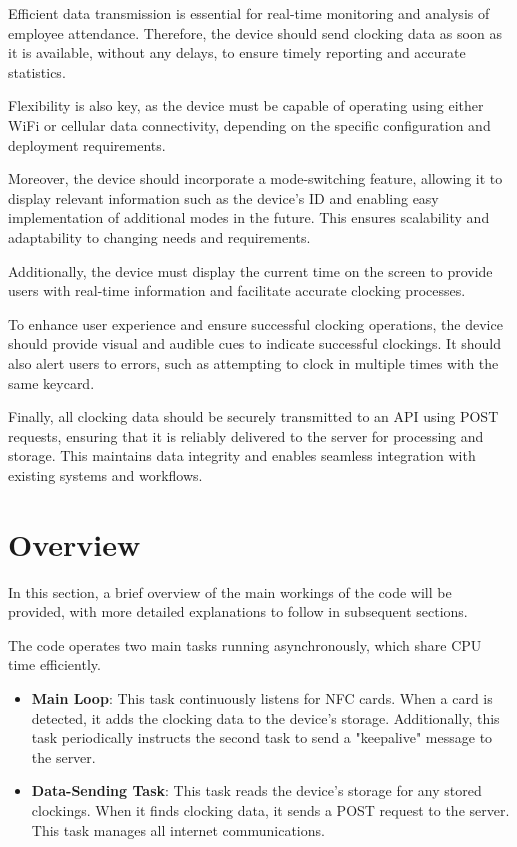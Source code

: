 Efficient data transmission is essential for real-time monitoring and analysis of employee 
attendance. Therefore, the device should send clocking data as soon as it is available, without any 
delays, to ensure timely reporting and accurate statistics.

Flexibility is also key, as the device must be capable of operating using either WiFi or cellular 
data connectivity, depending on the specific configuration and deployment requirements.

Moreover, the device should incorporate a mode-switching feature, allowing it to display relevant 
information such as the device's ID and enabling easy implementation of additional modes in the 
future. This ensures scalability and adaptability to changing needs and requirements.

Additionally, the device must display the current time on the screen to provide users with 
real-time information and facilitate accurate clocking processes.

To enhance user experience and ensure successful clocking operations, the device should provide 
visual and audible cues to indicate successful clockings. It should also alert users to errors, 
such as attempting to clock in multiple times with the same keycard.

Finally, all clocking data should be securely transmitted to an API using POST requests, ensuring 
that it is reliably delivered to the server for processing and storage. This maintains data 
integrity and enables seamless integration with existing systems and workflows.



%
%

\section{Overview}

In this section, a brief overview of the main workings of the code will be provided, with more 
detailed explanations to follow in subsequent sections.

The code operates two main tasks running asynchronously, which share CPU time efficiently.

\begin{itemize}
	\item \textbf{Main Loop}: This task continuously listens for NFC cards. When a card is 
	detected, it adds the clocking data to the device's storage. Additionally, this task 
	periodically instructs the second task to send a "keepalive" message to the server.
	\item \textbf{Data-Sending Task}: This task reads the device's storage for any stored 
	clockings. When it finds clocking data, it sends a POST request to the server. This task 
	manages all internet communications.
\end{itemize}

